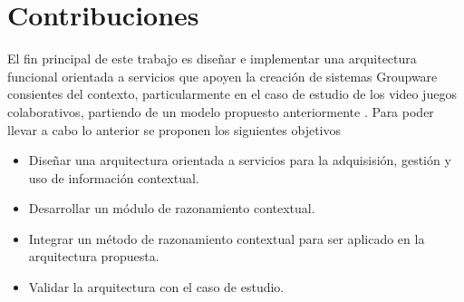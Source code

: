 \section{Contribuciones}
El fin principal de este trabajo es dise\~nar e implementar una arquitectura funcional orientada a servicios que apoyen la creaci\'on de sistemas Groupware consientes del contexto, particularmente en el caso de estudio de los video juegos colaborativos, partiendo de un modelo propuesto anteriormente \citep{montane2013context}. Para poder llevar a cabo lo anterior se proponen los siguientes objetivos
\begin{itemize}
\item Dise\~nar una arquitectura orientada a servicios para la adquisisi\'on, gesti\'on y uso de informaci\'on contextual.
\item Desarrollar un m\'odulo de razonamiento contextual.
\item Integrar un m\'etodo de razonamiento contextual para ser aplicado en la arquitectura propuesta.
\item Validar la arquitectura con el caso de estudio.
\end{itemize}